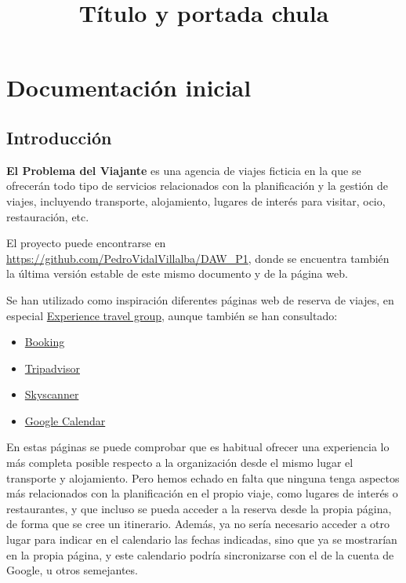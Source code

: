 \documentclass[11pt, a4paper]{book}
\title{Título y portada chula}
\begin{document}
	\maketitle
	
	\tableofcontents
	\newpage
	\thispagestyle{empty}
	
	\chapter{Documentación inicial}
	
	\section{Introducción}
	\textbf{El Problema del Viajante} es una agencia de viajes ficticia en la que se ofrecerán todo tipo de servicios relacionados con la planificación y la gestión de viajes, incluyendo transporte, alojamiento, lugares de interés para visitar, ocio, restauración, etc.
	
	El proyecto puede encontrarse en \href{https://github.com/PedroVidalVillalba/DAW_P1}{https://github.com/PedroVidalVillalba/DAW\_P1}, donde se encuentra también la última versión estable de este mismo documento y de la página web.
	
	
	Se han utilizado como inspiración diferentes páginas web de reserva de viajes, en especial \href{https://experiencetravelgroup.com}{Experience travel group}, aunque también se han consultado:
	\begin{itemize}
		\item \href{https://booking.com}{Booking}
		\item \href{https://tripadvisor.es}{Tripadvisor}
		\item \href{https://skyscanner.es}{Skyscanner}
		\item \href{https://calendar.google.com/calendar/u/0/r}{Google Calendar}
	\end{itemize}
	
	 En estas páginas se puede comprobar que es habitual ofrecer una experiencia lo más completa posible respecto a la organización desde el mismo lugar el transporte y alojamiento. Pero hemos echado en falta que ninguna tenga aspectos más relacionados con la planificación en el propio viaje, como lugares de interés o restaurantes, y que incluso se pueda acceder a la reserva desde la propia página, de forma que se cree un itinerario. Además, ya no sería necesario acceder a otro lugar para indicar en el calendario las fechas indicadas, sino que ya se mostrarían en la propia página, y este calendario podría sincronizarse con el de la cuenta de Google, u otros semejantes.
	 
\end{document}
